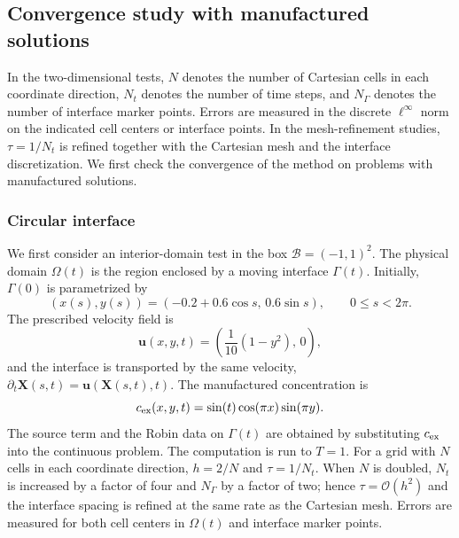\documentclass[11pt,reqno]{amsart}
\theoremstyle{plain}
\theoremstyle{definition}
\numberwithin{equation}{section}
\newcommand{\p}{\partial}
\newcommand{\mc}[1]{\mathcal{#1}}
\newcommand{\bm}[1]{\boldsymbol{#1}}
\begin{document}
\subsection{Convergence study with manufactured solutions}

In the two-dimensional tests, $N$ denotes the number of
Cartesian cells in each coordinate direction, $N_t$ denotes the number of time
steps, and $N_\Gamma$ denotes the number of interface marker points. Errors are
measured in the discrete $\ell^\infty$ norm on the indicated cell centers or
interface points. In the mesh-refinement studies, $\tau=1/N_t$ is refined
together with the Cartesian mesh and the interface discretization. We first check the convergence of the method on problems with manufactured solutions.

\subsubsection{Circular interface}
We first consider an interior-domain test in the box $\mc B=(-1,1)^2$. The
physical domain $\Omega(t)$ is the region enclosed by a moving interface
$\Gamma(t)$. Initially, $\Gamma(0)$ is parametrized by
\begin{equation}
(x(s),y(s))=(-0.2+0.6\cos s,\,0.6\sin s),
\qquad 0\leq s<2\pi.
\end{equation}
The prescribed velocity field is
\begin{equation}
\bm u(x, y, t) = \left(\frac{1}{10} (1-y^2),\,0\right),
\end{equation}
and the interface is transported by the same velocity,
$\p_t\bm X(s,t)=\bm u(\bm X(s,t),t)$. The manufactured concentration is
\begin{equation}
c_{\rm ex}(x, y, t) = \sin(t) \cos(\pi x) \sin(\pi y).
\end{equation}
The source term and the Robin data on $\Gamma(t)$ are obtained by substituting $c_{\rm ex}$ into the continuous problem. The computation is run to $T=1$. For a grid with $N$ cells in each coordinate direction, $h=2/N$ and $\tau=1/N_t$. When $N$ is doubled, $N_t$ is increased by
a factor of four and $N_\Gamma$ by a factor of two; hence $\tau=\mc O(h^2)$ and
the interface spacing is refined at the same rate as the Cartesian mesh. Errors are measured for both cell centers in $\Omega(t)$ and interface marker points.
\end{document}
